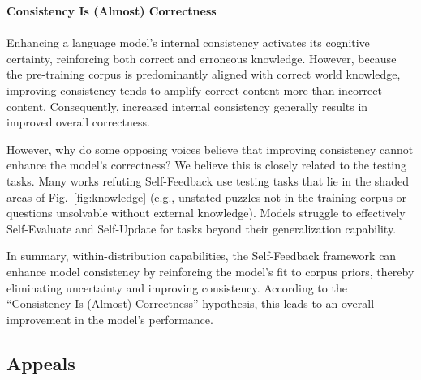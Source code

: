 \documentclass[lettersize,journal]{IEEEtran}
\begin{document}
\begin{tcolorbox}[colback=white!98!black,colframe=white!30!black,boxsep=1.1pt,top=6.75pt]%
\vspace{1.75pt}%
\textbf{Consistency Is (Almost) Correctness}\\[-0.575em]
\noindent\makebox[\textwidth]{\rule{\textwidth}{0.4pt}}
\\[0.25em]
Enhancing a language model's internal consistency activates its cognitive certainty, reinforcing both correct and erroneous knowledge. However, because the pre-training corpus is predominantly aligned with correct world knowledge, improving consistency tends to amplify correct content more than incorrect content. Consequently, increased internal consistency generally results in improved overall correctness.
\end{tcolorbox}

However, why do some opposing voices believe that improving consistency cannot enhance the model's correctness? We believe this is closely related to the testing tasks. Many works refuting Self-Feedback use testing tasks that lie in the shaded areas of Fig.~\ref{fig:knowledge} (e.g., unstated puzzles not in the training corpus or questions unsolvable without external knowledge). Models struggle to effectively Self-Evaluate and Self-Update for tasks beyond their generalization capability.

In summary, within-distribution capabilities, the Self-Feedback framework can enhance model consistency by reinforcing the model's fit to corpus priors, thereby eliminating uncertainty and improving consistency. According to the ``Consistency Is (Almost) Correctness'' hypothesis, this leads to an overall improvement in the model's performance.







\subsection{Appeals}
\end{document}
